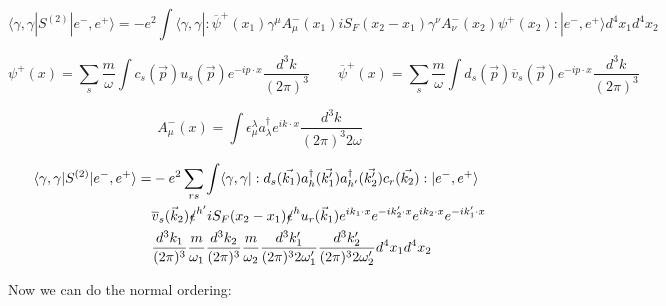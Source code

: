 \documentclass[a4]{article}
\begin{document}
        \begin{framed}


            \begin{equation}
                \langle \gamma, \gamma | S^{(2)} | e^{-}, e^{+} \rangle = -e^{2} \int \langle \gamma, \gamma |:\overline{\psi}^{+} (x_1) \gamma^{\mu} A_{\mu}^{-} (x_1) i S_{F} (x_2 - x_1) \gamma^{\nu} A_{\nu}^{-} (x_2) \psi^{+} (x_2):| e^{-}, e^{+} \rangle d^4 x_1 d^4 x_2
            \end{equation}

            \begin{equation}
                \psi^{+} (x) = \sum_{s} \frac{m}{\omega} \int c_{s} (\vec{p}) u_{s} (\vec{p}) e^{- i p \cdot x} \frac{d^3 k}{(2 \pi)^{3}} \qquad \overline{\psi}^{+} (x) = \sum_{s} \frac{m}{\omega} \int d_{s} (\vec{p}) \overline{v}_{s} (\vec{p}) e^{- i p \cdot x} \frac{d^3 k}{(2 \pi)^{3}}
            \end{equation}

            \begin{equation}
                A_{\mu}^{-} (x) = \int \epsilon^{\lambda}_{\mu} a^{\dagger}_{\lambda} e^{i k \cdot x} \frac{d^3 k}{(2 \pi)^{3} 2 \omega}
            \end{equation}

            \begin{equation}
                \begin{aligned}
                    \langle \gamma, \gamma | S^{(2)} | e^{-}, e^{+} \rangle = & - e^{2} \sum_{r s} \int \langle \gamma, \gamma |:d_{s} (\vec{k_1}) a^{\dagger}_{h} (\vec{k'_1}) a^{\dagger}_{h'} (\vec{k'_2}) c_{r} (\vec{k_2}):| e^{-}, e^{+} \rangle \\
                    & \overline{v}_{s} (\vec{k}_2) \slashed{\epsilon}^{h'} i S_{F} (x_2 - x_1) \slashed{\epsilon}^{h} u_{r} (\vec{k}_1) e^{i k_1 \cdot x} e^{- i k'_2 \cdot x} e^{i k_2 \cdot x} e^{- i k'_1 \cdot x} \\
                    & \frac{d^3 k_1}{(2 \pi)^{3}} \frac{m}{\omega_1} \frac{d^3 k_2}{(2 \pi)^{3}} \frac{m}{\omega_2} \frac{d^3 k'_1}{(2 \pi)^{3} 2 \omega'_1} \frac{d^3 k'_2}{(2 \pi)^{3} 2 \omega'_2} d^4 x_1 d^4 x_2
                \end{aligned}
            \end{equation}

            Now we can do the normal ordering:


\end{framed}
\end{document}
